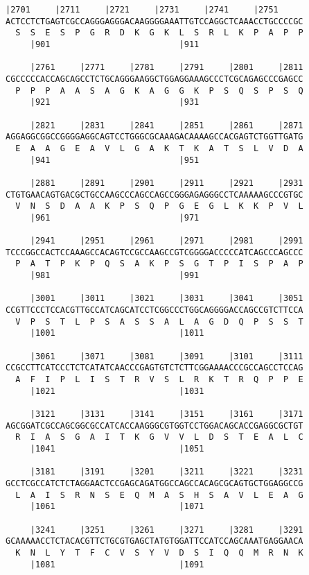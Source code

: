 \documentclass{article}
\begin{document}
\begin{Verbatim}[fontfamily=courier]
     |2701     |2711     |2721     |2731     |2741     |2751
ACTCCTCTGAGTCGCCAGGGAGGGACAAGGGGAAATTGTCCAGGCTCAAACCTGCCCCGC
  S  S  E  S  P  G  R  D  K  G  K  L  S  R  L  K  P  A  P  P
     |901                          |911                     

     |2761     |2771     |2781     |2791     |2801     |2811
CGCCCCCACCAGCAGCCTCTGCAGGGAAGGCTGGAGGAAAGCCCTCGCAGAGCCCGAGCC
  P  P  P  A  A  S  A  G  K  A  G  G  K  P  S  Q  S  P  S  Q
     |921                          |931                     

     |2821     |2831     |2841     |2851     |2861     |2871
AGGAGGCGGCCGGGGAGGCAGTCCTGGGCGCAAAGACAAAAGCCACGAGTCTGGTTGATG
  E  A  A  G  E  A  V  L  G  A  K  T  K  A  T  S  L  V  D  A
     |941                          |951                     

     |2881     |2891     |2901     |2911     |2921     |2931
CTGTGAACAGTGACGCTGCCAAGCCCAGCCAGCCGGGAGAGGGCCTCAAAAAGCCCGTGC
  V  N  S  D  A  A  K  P  S  Q  P  G  E  G  L  K  K  P  V  L
     |961                          |971                     

     |2941     |2951     |2961     |2971     |2981     |2991
TCCCGGCCACTCCAAAGCCACAGTCCGCCAAGCCGTCGGGGACCCCCATCAGCCCAGCCC
  P  A  T  P  K  P  Q  S  A  K  P  S  G  T  P  I  S  P  A  P
     |981                          |991                     

     |3001     |3011     |3021     |3031     |3041     |3051
CCGTTCCCTCCACGTTGCCATCAGCATCCTCGGCCCTGGCAGGGGACCAGCCGTCTTCCA
  V  P  S  T  L  P  S  A  S  S  A  L  A  G  D  Q  P  S  S  T
     |1001                         |1011                    

     |3061     |3071     |3081     |3091     |3101     |3111
CCGCCTTCATCCCTCTCATATCAACCCGAGTGTCTCTTCGGAAAACCCGCCAGCCTCCAG
  A  F  I  P  L  I  S  T  R  V  S  L  R  K  T  R  Q  P  P  E
     |1021                         |1031                    

     |3121     |3131     |3141     |3151     |3161     |3171
AGCGGATCGCCAGCGGCGCCATCACCAAGGGCGTGGTCCTGGACAGCACCGAGGCGCTGT
  R  I  A  S  G  A  I  T  K  G  V  V  L  D  S  T  E  A  L  C
     |1041                         |1051                    

     |3181     |3191     |3201     |3211     |3221     |3231
GCCTCGCCATCTCTAGGAACTCCGAGCAGATGGCCAGCCACAGCGCAGTGCTGGAGGCCG
  L  A  I  S  R  N  S  E  Q  M  A  S  H  S  A  V  L  E  A  G
     |1061                         |1071                    

     |3241     |3251     |3261     |3271     |3281     |3291
GCAAAAACCTCTACACGTTCTGCGTGAGCTATGTGGATTCCATCCAGCAAATGAGGAACA
  K  N  L  Y  T  F  C  V  S  Y  V  D  S  I  Q  Q  M  R  N  K
     |1081                         |1091                    


\end{Verbatim}
\end{document}
